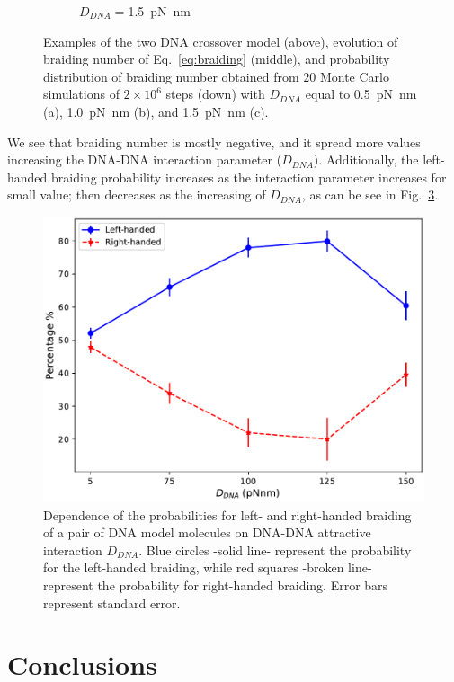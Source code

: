 \documentclass[a4paper,10pt]{article}
\begin{document}
\begin{figure}[htbp]
\begin{subfigure}{.3\textwidth}
\caption{$D_{DNA}=$\SI{1.5}{\pico\newton\nano\meter}}
\label{fig:braD_c}
\end{subfigure}
\caption{Examples of the two DNA crossover model (above), evolution of braiding number of Eq.~\ref{eq:braiding} (middle), and probability distribution of braiding number obtained from $20$ Monte Carlo simulations of $2\times 10^6$ steps (down) with $D_{DNA}$ equal to \SI{0.5}{\pico\newton\nano\meter} (a), \SI{1.0}{\pico\newton\nano\meter} (b), and \SI{1.5}{\pico\newton\nano\meter} (c).}
\label{fig:braD}
\end{figure}

We see that braiding number is mostly negative, and it spread more values increasing the DNA-DNA interaction parameter ($D_{DNA}$).
Additionally, the left-handed braiding probability increases as the interaction parameter increases for small value; then decreases as the increasing of $D_{DNA}$, as can be see in Fig.~\ref{fig:braD_pr}.

\begin{figure}[htbp]
\centering
\includegraphics[width=.6\textwidth]{brD_br_gr.pdf}
\caption{Dependence of the probabilities for left- and right-handed braiding of a pair of DNA model molecules on DNA-DNA attractive interaction $D_{DNA}$.
Blue circles -solid line- represent the probability for the left-handed braiding, while red squares -broken line- represent the probability for right-handed braiding.
Error bars represent standard error.}
\label{fig:braD_pr}
\end{figure}

\section{Conclusions}

\clearpage
{}
\printbibliography
\end{document}
